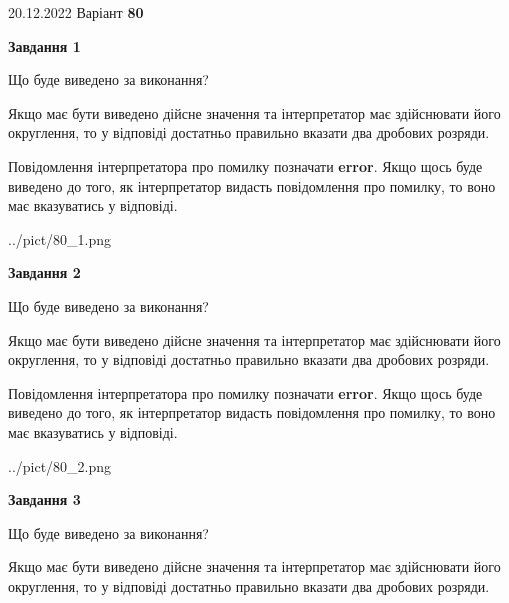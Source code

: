 \documentclass[12pt, ukrainian]{article}
\begin{document}
{20.12.2022 Варіант \No \textbf { 80 }\par}
{
\begin {Large}

{\begin {center}\textbf{Завдання 1}\end {center}}\par
Що буде виведено за виконання? \par

Якщо має бути виведено дійсне значення та інтерпретатор має здійснювати його округлення, 
то у відповіді достатньо правильно вказати два дробових розряди.

Повідомлення інтерпретатора про помилку позначати \textbf{error}.
Якщо щось буде виведено до того, як інтерпретатор видасть повідомлення про помилку, 
то воно має вказуватись у відповіді. \par

\begin{center}
	{../pict/80_1.png}
\end{center}
\newpage

{\begin {center}\textbf{Завдання 2}\end {center}}\par
Що буде виведено за виконання? \par

Якщо має бути виведено дійсне значення та інтерпретатор має здійснювати його округлення, 
то у відповіді достатньо правильно вказати два дробових розряди.

Повідомлення інтерпретатора про помилку позначати \textbf{error}.
Якщо щось буде виведено до того, як інтерпретатор видасть повідомлення про помилку, 
то воно має вказуватись у відповіді. \par

\begin{center}
	{../pict/80_2.png}
\end{center}
\newpage

{\begin {center}\textbf{Завдання 3}\end {center}}\par
Що буде виведено за виконання? \par

Якщо має бути виведено дійсне значення та інтерпретатор має здійснювати його округлення, 
то у відповіді достатньо правильно вказати два дробових розряди.


\end{Large}}
\end{document}
